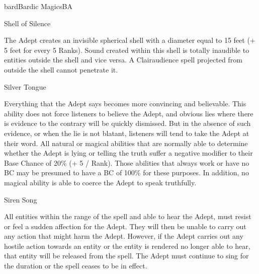 \begin{College}[2.1]{bard}{Bardic Magics}{BA}
\begin{spell}[S-10]{Shell of Silence}

\begin{effects}
The Adept creates an invisible spherical shell with a diameter equal
to 15 feet (+ 5 feet for every 5 Ranks).  Sound created within this
shell is totally inaudible to entities outside the shell and vice
versa.  A Clairaudience spell projected from outside the shell cannot
penetrate it.
\end{effects}
\end{spell}

\begin{spell}[S-11]{Silver Tongue}

\begin{effects}
Everything that the Adept says becomes more convincing and believable.
This ability does not force listeners to believe the Adept, and
obvious lies where there is evidence to the contrary will be quickly
dismissed.  But in the absence of such evidence, or when the lie is
not blatant, listeners will tend to take the Adept at their word. All
natural or magical abilities that are normally able to determine
whether the Adept is lying or telling the truth suffer a negative
modifier to their Base Chance of 20\% (+ 5 / Rank).  Those abilities
that always work or have no BC may be presumed to have a BC of 100\%
for these purposes. In addition, no magical ability is able to coerce
the Adept to speak truthfully.
\end{effects}
\end{spell}

\begin{spell}[S-12]{Siren Song}

\begin{effects}
All entities within the range of the spell and able to hear the Adept,
must resist or feel a sudden affection for the Adept.  They will then
be unable to carry out any action that might harm the Adept. However,
if the Adept carries out any hostile action towards an entity or the
entity is rendered no longer able to hear, that entity will be
released from the spell.  The Adept must continue to sing for the
duration or the spell ceases to be in effect.
\end{effects}
\end{spell}


\end{College}
